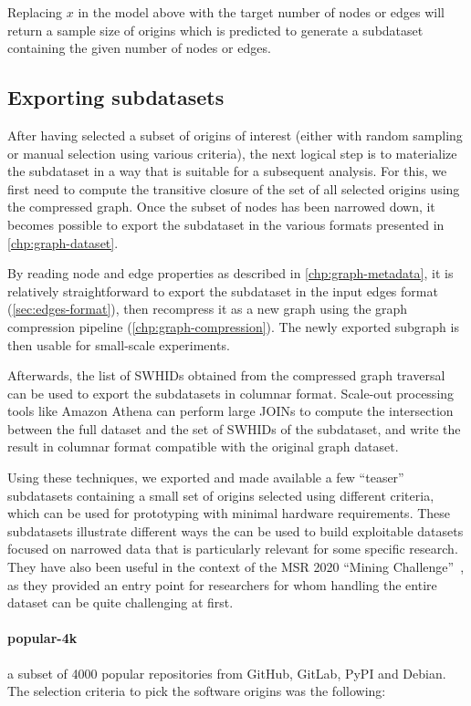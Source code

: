 Replacing $x$ in the model above with the target number of nodes or edges will
return a sample size of origins which is predicted to generate a subdataset
containing the given number of nodes or edges.

\subsection{Exporting subdatasets}

After having selected a subset of origins of interest (either with random
sampling or manual selection using various criteria), the next logical step is
to materialize the subdataset in a way that is suitable for a subsequent
analysis.
For this, we first need to compute the transitive closure of the set of all
selected origins using the compressed graph. Once the subset of nodes has been
narrowed down, it becomes possible to export the subdataset in the various
formats presented in \cref{chp:graph-dataset}.

By reading node and edge properties as described in
\cref{chp:graph-metadata}, it is relatively straightforward to export the
subdataset in the input edges format (\cref{sec:edges-format}), then recompress
it as a new graph using the graph compression pipeline
(\cref{chp:graph-compression}). The newly exported subgraph is then usable for
small-scale experiments.

Afterwards, the list of \glspl{SWHID} obtained from the compressed graph
traversal can be used to export the subdatasets in columnar format. Scale-out
processing tools like Amazon Athena can perform large JOINs to compute the
intersection between the full dataset and the set of \glspl{SWHID} of the
subdataset, and write the result in columnar format compatible with the
original graph dataset.

Using these techniques, we exported and made available a few ``teaser''
subdatasets containing a small set of origins selected using different
criteria, which can be used for prototyping with minimal hardware requirements.
These subdatasets illustrate different ways the \SWHGD{} can be used to build
exploitable datasets focused on narrowed data that is particularly relevant for
some specific research. They have also been useful in the context of the
MSR 2020 ``Mining Challenge''~\cite{msr-2020-challenge}, as they provided an
entry point for researchers for whom handling the entire dataset can be quite
challenging at first.

\paragraph{popular-4k} a subset of 4000 popular repositories from
GitHub, GitLab, PyPI and Debian. The selection criteria to pick the software
origins was the following:

